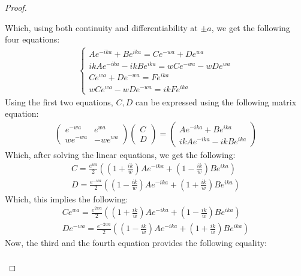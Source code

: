 \documentclass{article}
\begin{document}
\begin{proof}
\begin{enumerate}
        Which, using both continuity and differentiability at $\pm a$, we get the following four equations:
        \begin{align}
            \begin{cases}
                Ae^{-ika}+Be^{ika}=Ce^{-wa}+De^{wa}\\
                ikAe^{-ika}-ikBe^{ika}=wCe^{-wa}-wDe^{wa}\\
                Ce^{wa}+De^{-wa}=Fe^{ika}\\
                wCe^{wa}-wDe^{-wa}=ikFe^{ika}
            \end{cases}
        \end{align}
        Using the first two equations, $C,D$ can be expressed using the following matrix equation:
        \begin{align}
            \begin{pmatrix}
                e^{-wa}&e^{wa}\\we^{-wa} & -we^{wa}
            \end{pmatrix}\begin{pmatrix}
                C\\D
            \end{pmatrix}=\begin{pmatrix}
                Ae^{-ika}+Be^{ika}\\ikAe^{-ika}-ikBe^{ika}
            \end{pmatrix}
        \end{align}
        Which, after solving the linear equations, we get the following:
        \begin{align}
            C=\frac{e^{wa}}{2}\left(\left(1+\frac{ik}{w}\right)Ae^{-ika}+\left(1-\frac{ik}{w}\right)Be^{ika}\right)\\
            D=\frac{e^{-wa}}{2}\left(\left(1-\frac{ik}{w}\right)Ae^{-ika}+\left(1+\frac{ik}{w}\right)Be^{ika}\right)
        \end{align}
        Which, this implies the following:
        \begin{align}
            Ce^{wa}=\frac{e^{2wa}}{2}\left(\left(1+\frac{ik}{w}\right)Ae^{-ika}+\left(1-\frac{ik}{w}\right)Be^{ika}\right)\\
            De^{-wa}=\frac{e^{-2wa}}{2}\left(\left(1-\frac{ik}{w}\right)Ae^{-ika}+\left(1+\frac{ik}{w}\right)Be^{ika}\right)
        \end{align}
        Now, the third and the fourth equation provides the following equality:
        \begin{align}

\end{align}
\end{enumerate}
\end{proof}
\end{document}
